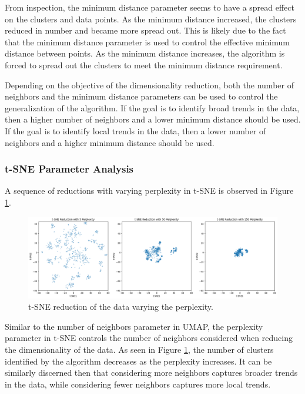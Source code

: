\documentclass[11pt]{article}
\begin{document}
\vspace{-0.5cm}

From inspection, the minimum distance parameter seems to have a spread effect on the clusters and data points. As the minimum distance increased, the clusters reduced in number and became more spread out. This is likely due to the fact that the minimum distance parameter is used to control the effective minimum distance between points. As the minimum distance increases, the algorithm is forced to spread out the clusters to meet the minimum distance requirement.

Depending on the objective of the dimensionality reduction, both the number of neighbors and the minimum distance parameters can be used to control the generalization of the algorithm. If the goal is to identify broad trends in the data, then a higher number of neighbors and a lower minimum distance should be used. If the goal is to identify local trends in the data, then a lower number of neighbors and a higher minimum distance should be used.

\subsubsection*{t-SNE Parameter Analysis}
A sequence of reductions with varying perplexity in t-SNE is observed in Figure \ref{fig:TSNE_vary}.

\begin{figure}[H]
    \centering
    \includegraphics[width=\textwidth]{Images/t-sne_vary.png}
    \caption{t-SNE reduction of the data varying the perplexity.}
    \label{fig:TSNE_vary}
\end{figure}

\vspace{-0.5cm}

Similar to the number of neighbors parameter in UMAP, the perplexity parameter in t-SNE controls the number of neighbors considered when reducing the dimensionality of the data. As seen in Figure \ref{fig:TSNE_vary}, the number of clusters identified by the algorithm decreases as the perplexity increases. It can be similarly discerned then that considering more neighbors captures broader trends in the data, while considering fewer neighbors captures more local trends.
\end{document}

